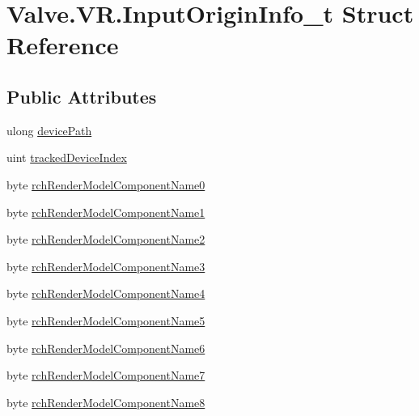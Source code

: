 \hypertarget{struct_valve_1_1_v_r_1_1_input_origin_info__t}{}\section{Valve.\+V\+R.\+Input\+Origin\+Info\+\_\+t Struct Reference}
\label{struct_valve_1_1_v_r_1_1_input_origin_info__t}
\subsection*{Public Attributes}
\begin{DoxyCompactItemize}
\item 
ulong \mbox{\hyperlink{struct_valve_1_1_v_r_1_1_input_origin_info__t_a12cc32a8cf76889f022c046c788f06a2}{device\+Path}}
\item 
uint \mbox{\hyperlink{struct_valve_1_1_v_r_1_1_input_origin_info__t_a57465fa77a5ccd8c251b25a012b2c5df}{tracked\+Device\+Index}}
\item 
byte \mbox{\hyperlink{struct_valve_1_1_v_r_1_1_input_origin_info__t_a981af84ee8bcc2402bbff6710ab493df}{rch\+Render\+Model\+Component\+Name0}}
\item 
byte \mbox{\hyperlink{struct_valve_1_1_v_r_1_1_input_origin_info__t_af9943e30671f6b70167ab76c86f1326a}{rch\+Render\+Model\+Component\+Name1}}
\item 
byte \mbox{\hyperlink{struct_valve_1_1_v_r_1_1_input_origin_info__t_aec8db885a476f0f0347f87c28901ec78}{rch\+Render\+Model\+Component\+Name2}}
\item 
byte \mbox{\hyperlink{struct_valve_1_1_v_r_1_1_input_origin_info__t_a9bf4a96b4a56ccea8eb5ca212d853a17}{rch\+Render\+Model\+Component\+Name3}}
\item 
byte \mbox{\hyperlink{struct_valve_1_1_v_r_1_1_input_origin_info__t_ac765100cd5f47b3641cc62030278d45e}{rch\+Render\+Model\+Component\+Name4}}
\item 
byte \mbox{\hyperlink{struct_valve_1_1_v_r_1_1_input_origin_info__t_a207f432cb9ded74f71c2b93e38992d9b}{rch\+Render\+Model\+Component\+Name5}}
\item 
byte \mbox{\hyperlink{struct_valve_1_1_v_r_1_1_input_origin_info__t_a08b796932732f54fe74ce179bbfd9bfc}{rch\+Render\+Model\+Component\+Name6}}
\item 
byte \mbox{\hyperlink{struct_valve_1_1_v_r_1_1_input_origin_info__t_a408a23a630c0a94db76c71a3d9111a19}{rch\+Render\+Model\+Component\+Name7}}
\item 
byte \mbox{\hyperlink{struct_valve_1_1_v_r_1_1_input_origin_info__t_a3e21311746fa46858d8eba77eb5ba6a0}{rch\+Render\+Model\+Component\+Name8}}

\end{DoxyCompactItemize}
